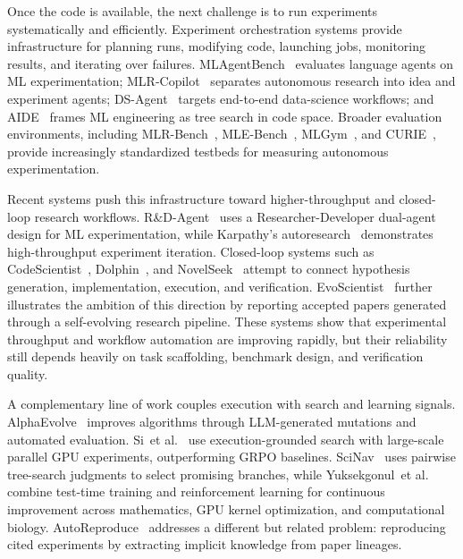 \documentclass{llmxive}
\providecommand{\etal}{et al.\xspace}
\begin{document}
Once the code is available, the next challenge is to run experiments systematically and efficiently. Experiment orchestration systems provide infrastructure for planning runs, modifying code, launching jobs, monitoring results, and iterating over failures. MLAgentBench~\cite{mlagentbench2024} evaluates language agents on ML experimentation; MLR-Copilot~\cite{mlrcopilot2024} separates autonomous research into idea and experiment agents; DS-Agent~\cite{dsagent2024} targets end-to-end data-science workflows; and AIDE~\cite{jiang2025aide} frames ML engineering as tree search in code space. Broader evaluation environments, including MLR-Bench~\cite{mlrbench2025}, MLE-Bench~\cite{chan2024mlebench}, MLGym~\cite{mlgym2025}, and CURIE~\cite{curie2025}, provide increasingly standardized testbeds for measuring autonomous experimentation.

Recent systems push this infrastructure toward higher-throughput and closed-loop research workflows. R\&D-Agent~\cite{chen2025rdagent} uses a Researcher-Developer dual-agent design for ML experimentation, while Karpathy's autoresearch~\cite{karpathy2025autoresearch} demonstrates high-throughput experiment iteration. Closed-loop systems such as CodeScientist~\cite{codescientist2025}, Dolphin~\cite{dolphin2025}, and NovelSeek~\cite{novelseek2025} attempt to connect hypothesis generation, implementation, execution, and verification. EvoScientist~\cite{evoscientist2026} further illustrates the ambition of this direction by reporting accepted papers generated through a self-evolving research pipeline. These systems show that experimental throughput and workflow automation are improving rapidly, but their reliability still depends heavily on task scaffolding, benchmark design, and verification quality.

A complementary line of work couples execution with search and learning signals. AlphaEvolve~\cite{alphaevolve2025} improves algorithms through LLM-generated mutations and automated evaluation. Si~\etal~\cite{si2026executiongrounded} use execution-grounded search with large-scale parallel GPU experiments, outperforming GRPO baselines. SciNav~\cite{scinav2026} uses pairwise tree-search judgments to select promising branches, while Yuksekgonul~\etal~\cite{yuksekgonul2026learntodiscover} combine test-time training and reinforcement learning for continuous improvement across mathematics, GPU kernel optimization, and computational biology. AutoReproduce~\cite{autoreproduce2025} addresses a different but related problem: reproducing cited experiments by extracting implicit knowledge from paper lineages.
\end{document}

